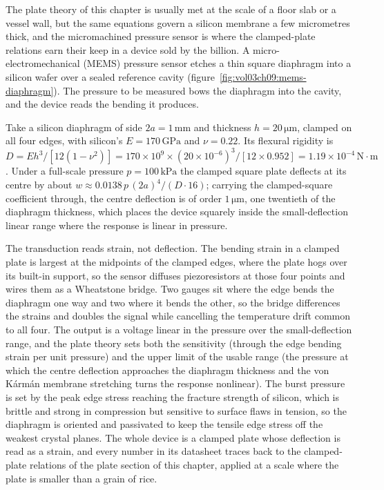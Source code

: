 

The plate theory of this chapter is usually met at the scale of a floor
slab or a vessel wall, but the same equations govern a silicon membrane a
few micrometres thick, and the micromachined pressure sensor is where the
clamped-plate relations earn their keep in a device sold by the billion.
A micro-electromechanical (MEMS) pressure sensor etches a thin square
diaphragm into a silicon wafer over a sealed reference cavity
(figure~\ref{fig:vol03ch09:mems-diaphragm}). The pressure to be measured
bows the diaphragm into the cavity, and the device reads the bending it
produces.

Take a silicon diaphragm of side $2a = 1\,\si{\milli\meter}$ and thickness
$h = 20\,\si{\micro\meter}$, clamped on all four edges, with silicon's
$E = 170\,\text{GPa}$ and $\nu = 0.22$. Its flexural rigidity is $D =
E h^3/[12(1-\nu^2)] = 170\times 10^9\times (20\times 10^{-6})^3/[12\times
0.952] = 1.19\times 10^{-4}\,\text{N}\cdot\text{m}$. Under a full-scale
pressure $p = 100\,\text{kPa}$ the clamped square plate deflects at its
centre by about $w \approx 0.0138\,p\,(2a)^4/(D\cdot 16)$; carrying the
clamped-square coefficient through, the centre deflection is of order
$1\,\si{\micro\meter}$, one twentieth of the diaphragm thickness, which
places the device squarely inside the small-deflection linear range where
the response is linear in pressure.

The transduction reads strain, not deflection. The bending strain in a
clamped plate is largest at the midpoints of the clamped edges, where the
plate hogs over its built-in support, so the sensor diffuses piezoresistors
at those four points and wires them as a Wheatstone bridge. Two gauges sit
where the edge bends the diaphragm one way and two where it bends the other,
so the bridge differences the strains and doubles the signal while
cancelling the temperature drift common to all four. The output is a voltage
linear in the pressure over the small-deflection range, and the plate
theory sets both the sensitivity (through the edge bending strain per unit
pressure) and the upper limit of the usable range (the pressure at which the
centre deflection approaches the diaphragm thickness and the von K\'arm\'an
membrane stretching turns the response nonlinear). The burst pressure is
set by the peak edge stress reaching the fracture strength of silicon, which
is brittle and strong in compression but sensitive to surface flaws in
tension, so the diaphragm is oriented and passivated to keep the tensile
edge stress off the weakest crystal planes. The whole device is a clamped
plate whose deflection is read as a strain, and every number in its
datasheet traces back to the clamped-plate relations of the plate section
of this chapter, applied at a scale where the plate is smaller than a grain
of rice.

